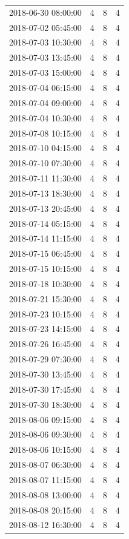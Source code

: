\begin{tabular}{lrrr}
2018-06-30 08:00:00 & 4 & 8 & 4 \\
2018-07-02 05:45:00 & 4 & 8 & 4 \\
2018-07-03 10:30:00 & 4 & 8 & 4 \\
2018-07-03 13:45:00 & 4 & 8 & 4 \\
2018-07-03 15:00:00 & 4 & 8 & 4 \\
2018-07-04 06:15:00 & 4 & 8 & 4 \\
2018-07-04 09:00:00 & 4 & 8 & 4 \\
2018-07-04 10:30:00 & 4 & 8 & 4 \\
2018-07-08 10:15:00 & 4 & 8 & 4 \\
2018-07-10 04:15:00 & 4 & 8 & 4 \\
2018-07-10 07:30:00 & 4 & 8 & 4 \\
2018-07-11 11:30:00 & 4 & 8 & 4 \\
2018-07-13 18:30:00 & 4 & 8 & 4 \\
2018-07-13 20:45:00 & 4 & 8 & 4 \\
2018-07-14 05:15:00 & 4 & 8 & 4 \\
2018-07-14 11:15:00 & 4 & 8 & 4 \\
2018-07-15 06:45:00 & 4 & 8 & 4 \\
2018-07-15 10:15:00 & 4 & 8 & 4 \\
2018-07-18 10:30:00 & 4 & 8 & 4 \\
2018-07-21 15:30:00 & 4 & 8 & 4 \\
2018-07-23 10:15:00 & 4 & 8 & 4 \\
2018-07-23 14:15:00 & 4 & 8 & 4 \\
2018-07-26 16:45:00 & 4 & 8 & 4 \\
2018-07-29 07:30:00 & 4 & 8 & 4 \\
2018-07-30 13:45:00 & 4 & 8 & 4 \\
2018-07-30 17:45:00 & 4 & 8 & 4 \\
2018-07-30 18:30:00 & 4 & 8 & 4 \\
2018-08-06 09:15:00 & 4 & 8 & 4 \\
2018-08-06 09:30:00 & 4 & 8 & 4 \\
2018-08-06 10:15:00 & 4 & 8 & 4 \\
2018-08-07 06:30:00 & 4 & 8 & 4 \\
2018-08-07 11:15:00 & 4 & 8 & 4 \\
2018-08-08 13:00:00 & 4 & 8 & 4 \\
2018-08-08 20:15:00 & 4 & 8 & 4 \\
2018-08-12 16:30:00 & 4 & 8 & 4 \\

\end{tabular}
